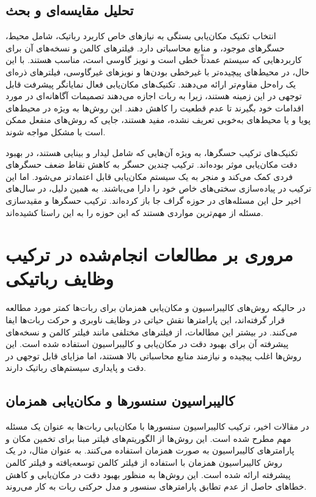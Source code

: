 \subsection{تحلیل مقایسه‌ای و بحث}

انتخاب تکنیک مکان‌یابی بستگی به نیازهای خاص کاربرد رباتیک، شامل محیط، حسگرهای موجود، و منابع محاسباتی دارد. فیلترهای کالمن و نسخه‌های آن برای کاربردهایی که سیستم عمدتاً خطی است و نویز گاوسی است، مناسب هستند. با این حال، در محیط‌های پیچیده‌تر با غیرخطی بودن‌ها و نویزهای غیرگاوسی، فیلترهای ذره‌ای یک راه‌حل مقاوم‌تر ارائه می‌دهند. تکنیک‌های مکان‌یابی فعال نمایانگر پیشرفت قابل توجهی در این زمینه هستند، زیرا به ربات اجازه می‌دهند تصمیمات آگاهانه‌ای در مورد اقدامات خود بگیرند تا عدم قطعیت را کاهش دهند. این روش‌ها به ویژه در محیط‌های پویا و یا محیط‌های به‌خوبی تعریف نشده، مفید هستند، جایی که روش‌های منفعل ممکن است با مشکل مواجه شوند.

تکنیک‌های ترکیب حسگرها، به ویژه آن‌هایی که شامل لیدار و بینایی هستند، در بهبود دقت مکان‌یابی موثر بوده‌اند. ترکیب چندین حسگر به کاهش نقاط ضعف حسگرهای فردی کمک می‌کند و منجر به یک سیستم مکان‌یابی قابل اعتمادتر می‌شود. اما این ترکیب در پیاده‌سازی سختی‌های خاص خود را دارا می‌باشند. به همین دلیل، در سال‌های اخیر حل این مسئله‌های در حوزه گراف جا باز کرده‌اند. ترکیب حسگر‌ها و مقید‌سازی مسئله از مهم‌ترین مواردی هستند که این حوزه ‌را به این راستا کشیده‌اند.

\section{مروری بر مطالعات انجام‌شده در ترکیب وظایف رباتیکی} 


در‌ حالیکه روش‌های کالیبراسیون و مکان‌یابی همزمان برای ربات‌ها کمتر مورد مطالعه قرار گرفته‌اند، این پارامترها نقش حیاتی در وظایف ناوبری و حرکت ربات‌ها ایفا می‌کنند. در بیشتر این مطالعات، از فیلترهای مختلفی مانند فیلتر کالمن و نسخه‌های پیشرفته آن برای بهبود دقت در مکان‌یابی و کالیبراسیون استفاده شده است. این روش‌ها اغلب پیچیده و نیازمند منابع محاسباتی بالا هستند، اما مزایای قابل توجهی در دقت و پایداری سیستم‌های رباتیک دارند.

\subsection{کالیبراسیون سنسورها و مکان‌یابی همزمان}
در مقالات اخیر، ترکیب کالیبراسیون سنسورها با مکان‌یابی ربات‌ها به عنوان یک مسئله مهم مطرح شده است. این روش‌ها از الگوریتم‌های فیلتر مبنا برای تخمین مکان و پارامترهای کالیبراسیون به صورت همزمان استفاده می‌کنند. به عنوان مثال، در \cite{kummerle2012simultaneous} یک روش کالیبراسیون همزمان با استفاده از فیلتر کالمن توسعه‌یافته و فیلتر کالمن پیشرفته ارائه شده است. این روش‌ها به منظور بهبود دقت در مکان‌یابی و کاهش خطاهای حاصل از عدم تطابق پارامترهای سنسور و مدل حرکتی ربات به کار می‌روند. 

